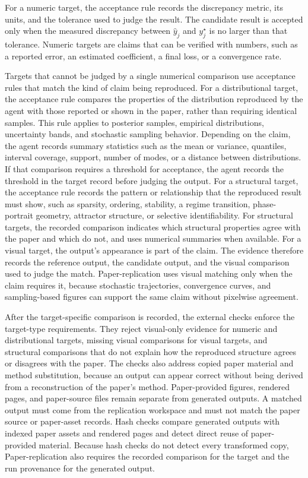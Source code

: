 \documentclass[authoryear,5p,times,nopreprintline]{elsarticle}
\begin{document}
For a numeric target, the acceptance rule records the discrepancy metric, its units, and the tolerance used to judge the result.
The candidate result is accepted only when the measured discrepancy between \(\widehat{y}_j\) and \(y_j^{\star}\) is no larger than that tolerance.
Numeric targets are claims that can be verified with numbers, such as a reported error, an estimated coefficient, a final loss, or a convergence rate.

Targets that cannot be judged by a single numerical comparison use acceptance rules that match the kind of claim being reproduced.
For a distributional target, the acceptance rule compares the properties of the distribution reproduced by the agent with those reported or shown in the paper, rather than requiring identical samples.
This rule applies to posterior samples, empirical distributions, uncertainty bands, and stochastic sampling behavior.
Depending on the claim, the agent records summary statistics such as the mean or variance, quantiles, interval coverage, support, number of modes, or a distance between distributions.
If that comparison requires a threshold for acceptance, the agent records the threshold in the target record before judging the output.
For a structural target, the acceptance rule records the pattern or relationship that the reproduced result must show, such as sparsity, ordering, stability, a regime transition, phase-portrait geometry, attractor structure, or selective identifiability.
For structural targets, the recorded comparison indicates which structural properties agree with the paper and which do not, and uses numerical summaries when available.
For a visual target, the output's appearance is part of the claim.
The evidence therefore records the reference output, the candidate output, and the visual comparison used to judge the match.
Paper-replication uses visual matching only when the claim requires it, because stochastic trajectories, convergence curves, and sampling-based figures can support the same claim without pixelwise agreement.

After the target-specific comparison is recorded, the external checks enforce the target-type requirements.
They reject visual-only evidence for numeric and distributional targets, missing visual comparisons for visual targets, and structural comparisons that do not explain how the reproduced structure agrees or disagrees with the paper.
The checks also address copied paper material and method substitution, because an output can appear correct without being derived from a reconstruction of the paper's method.
Paper-provided figures, rendered pages, and paper-source files remain separate from generated outputs.
A matched output must come from the replication workspace and must not match the paper source or paper-asset records.
Hash checks compare generated outputs with indexed paper assets and rendered pages and detect direct reuse of paper-provided material.
Because hash checks do not detect every transformed copy, Paper-replication also requires the recorded comparison for the target and the run provenance for the generated output.
\end{document}
